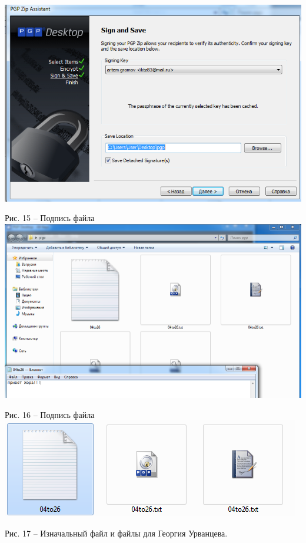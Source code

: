 \documentclass[a4paper,14pt]{extarticle}
\begin{document}
    \begin{center}
        \includegraphics[scale=0.6]{pics/13.png}

        Рис. 15 – Подпись файла\\
        \includegraphics[scale=0.4]{pics/14.png}

        Рис. 16 – Подпись файла\\
        \includegraphics[scale=0.7]{pics/17.png}
        
        Рис. 17 – Изначальный файл и файлы для Георгия Урванцева.
    \end{center}
\end{document}
